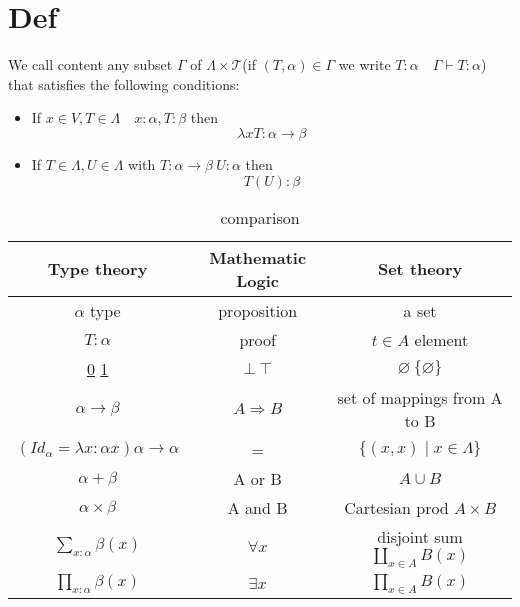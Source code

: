 \documentclass{book}
\begin{document}
\section{Def}
We call content any subset $\Gamma$ of $\Lambda\times\mathcal{T}$(if $(T,\alpha)\in \Gamma$ we write $T:\alpha\quad\Gamma\vdash T:\alpha$) that satisfies the following conditions:
\begin{itemize}
    \item If $x\in V, T\in \Lambda\quad x:\alpha,T:\beta$ then $$\lambda xT:\alpha\rightarrow\beta$$
    \item If $T\in \Lambda,U\in \Lambda$ with $T:\alpha\rightarrow\beta\ U:\alpha$ then $$T(U):\beta$$ 
\end{itemize}
\begin{table}[h]
	\centering
	\caption{comparison}
	\begin{tabular}{|c|c|c|}
		\hline
		 Type theory & Mathematic Logic & Set theory\\\hline
         $\alpha$ type & proposition & a set\\\hline
         $T:\alpha$ &proof&$t\in A$ element\\\hline
         \underline{0} \underline{1}&$\bot \ \top $&$\varnothing\ \{\varnothing\}$\\\hline
         $\alpha\rightarrow\beta$ &$A\Rightarrow B$&set of mappings from A to B\\\hline
         $(Id_\alpha=\lambda x:\alpha x)\alpha\rightarrow\alpha$&=&$\{(x,x)\mid x\in \Lambda\}$\\\hline
         $\alpha+\beta$&A or B&$A\cup B$\\\hline
         $\alpha\times\beta$&A and B&Cartesian prod $A\times B$\\\hline
         $\sum\limits_{x:\alpha}\beta(x)$&$\forall x$&disjoint sum $\coprod \limits_{x\in A}B(x)$\\\hline
        $\prod\limits_{x:\alpha}\beta(x)$&$\exists x$&$\prod\limits_{x\in A}B(x)$\\\hline
	\end{tabular}
\end{table}
\end{document}
